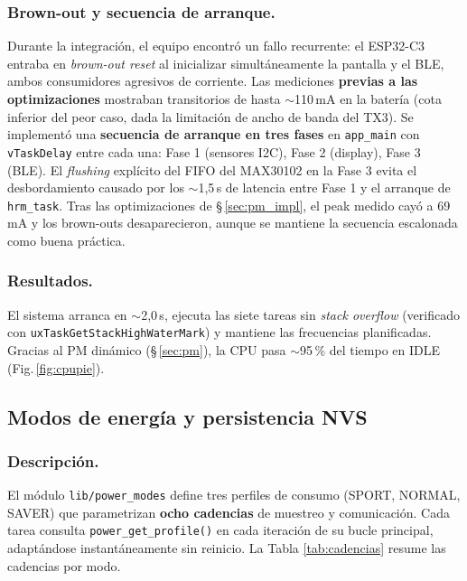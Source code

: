 \documentclass[letterpaper,11pt]{article}
\newcommand{\rfigura}[1]{Fig.\,\ref{#1}}
\newcommand{\rtabla}[1]{Tabla \ref{#1}}
\begin{document}
\subsubsection{Brown-out y secuencia de arranque.} Durante la integración, el equipo encontró
un fallo recurrente: el ESP32-C3 entraba en \textit{brown-out reset} al inicializar
simultáneamente la pantalla y el BLE, ambos consumidores agresivos de corriente. Las
mediciones \textbf{previas a las optimizaciones} mostraban transitorios de hasta
$\sim$110\,mA en la batería (cota inferior del peor caso, dada la limitación de ancho
de banda del TX3). Se implementó una \textbf{secuencia de arranque en tres fases} en
\texttt{app\_main} con \texttt{vTaskDelay} entre cada una: Fase 1 (sensores I2C),
Fase 2 (display), Fase 3 (BLE). El \textit{flushing} explícito del FIFO del MAX30102 en
la Fase 3 evita el desbordamiento causado por los $\sim$1,5\,s de latencia entre Fase 1
y el arranque de \texttt{hrm\_task}. Tras las optimizaciones de §\,\ref{sec:pm_impl},
el peak medido cayó a 69\,mA y los brown-outs desaparecieron, aunque se mantiene la
secuencia escalonada como buena práctica.

\subsubsection{Resultados.} El sistema arranca en $\sim$2,0\,s, ejecuta las siete tareas sin
\textit{stack overflow} (verificado con \texttt{uxTaskGetStackHighWaterMark}) y mantiene las
frecuencias planificadas. Gracias al PM dinámico (§\,\ref{sec:pm}), la CPU
pasa $\sim$95\,\% del tiempo en IDLE (\rfigura{fig:cpupie}).

\subsection{Modos de energía y persistencia NVS}
\label{sec:powermodes}
\subsubsection{Descripción.} El módulo \texttt{lib/power\_modes} define tres perfiles de
consumo (SPORT, NORMAL, SAVER) que parametrizan \textbf{ocho cadencias} de muestreo y
comunicación. Cada tarea consulta \texttt{power\_get\_profile()} en cada iteración de su
bucle principal, adaptándose instantáneamente sin reinicio. La \rtabla{tab:cadencias}
resume las cadencias por modo.
\end{document}
